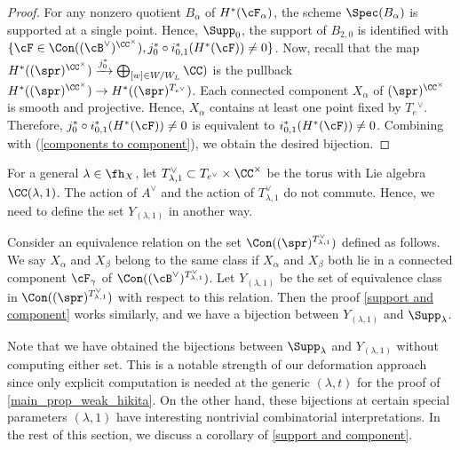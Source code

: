\documentclass[12pt]{amsart}
\begin{document}
\begin{proof}
   For any nonzero quotient $B_\alpha$ of $H^*(\cF_\alpha)$, the scheme $\Spec(B_\alpha)$ is supported at a single point. Hence, $\Supp_0$, the support of $B_{2,0}$ is identified with $\{\cF\in \Con((\cB^\vee)^{\CC^\times}), j_0^{*}\circ i^*_{0,1}(H^*(\cF))\neq 0\}$. Now, recall that the map $H^*((\spr)^{\CC^\times})\xrightarrow{j^*_{0}} \bigoplus_{[w]\in W/W_{L}} \CC)$ is the pullback $H^*((\spr)^{\CC^\times})\rightarrow H^*((\spr)^{T_{e^\vee}})$. Each connected component $X_\alpha$ of $(\spr)^{\CC^\times}$ is smooth and projective. Hence, $X_\alpha$ contains at least one point fixed by $T_e{^{\vee}}$. Therefore, $j_0^{*}\circ i^*_{0,1}(H^*(\cF))\neq 0$ is equivalent to $i^*_{0,1}(H^*(\cF))\neq 0$. Combining with (\ref{components to component}), we obtain the desired bijection.    
\end{proof}

\begin{rmk}
    For a general $\lambda\in \fh_X$, let $T^\vee_{\lambda,1}\subset T_{e^\vee}\times \CC^\times$ be the torus with Lie algebra $\CC(\lambda, 1)$. The action of $A^\vee$ and the action of $T^\vee_{\lambda,1}$ do not commute. Hence, we need to define the set $Y_{(\lambda, 1)}$ in another way.

    Consider an equivalence relation on the set $\Con((\spr)^{T^\vee_{\lambda,1}})$ defined as follows. We say $X_\alpha$ and $X_\beta$ belong to the same class if $X_\alpha$ and $X_\beta$ both lie in a connected component $\cF_\gamma$ of $\Con((\cB^\vee)^{T^\vee_{\lambda,1}})$. Let $Y_{(\lambda, 1)}$ be the set of equivalence class in $\Con((\spr)^{T^\vee_{\lambda,1}})$ with respect to this relation. Then the proof \cref{support and component} works similarly, and we have a bijection between $Y_{(\lambda,1)}$ and $\Supp_\lambda$.

\end{rmk}

\begin{rmk}
    Note that we have obtained the bijections between $\Supp_\lambda$ and $Y_{(\lambda,1)}$ without computing either set. This is a notable strength of our deformation approach since only explicit computation is needed at the generic $(\lambda,t)$ for the proof of \cref{main_prop_weak_hikita}. On the other hand, these bijections at certain special parameters $(\lambda, 1)$ have interesting nontrivial combinatorial interpretations. In the rest of this section, we discuss a corollary of \cref{support and component}.
\end{rmk}
 
\end{document}
